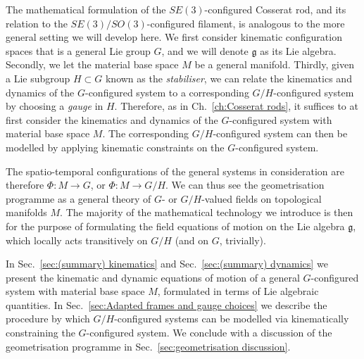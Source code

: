 The mathematical formulation of the $SE(3)$-configured Cosserat rod, and its relation to the $SE(3)/SO(3)$-configured filament, is analogous to the more general setting we will develop here. We first consider kinematic configuration spaces that is a general Lie group $G$, and we will denote $\mathfrak{g}$ as its Lie algebra. Secondly, we let the material base space $M$ be a general manifold. Thirdly, given a Lie subgroup $H \subset G$ known as the \textit{stabiliser}, we can relate the kinematics and dynamics of the $G$-configured system to a corresponding $G/H$-configured system by choosing a \textit{gauge} in $H$. Therefore, as in Ch.~\ref{ch:Cosserat rods}, it suffices to at first consider the kinematics and dynamics of the $G$-configured system with material base space $M$. The corresponding $G/H$-configured system can then be modelled by applying kinematic constraints on the $G$-configured system.

The spatio-temporal configurations of the general systems in consideration are therefore $\Phi : M \to G$, or $\Phi : M \to G/H$. We can thus see the geometrisation programme as a general theory of $G$- or $G/H$-valued fields on topological manifolds $M$. The majority of the mathematical technology we introduce is then for the purpose of formulating the field equations of motion on the Lie algebra $\mathfrak{g}$, which locally acts transitively on $G/H$ (and on $G$, trivially).

In Sec.~\ref{sec:(summary) kinematics} and Sec.~\ref{sec:(summary) dynamics} we present the kinematic and dynamic equations of motion of a general $G$-configured system with material base space $M$, formulated in terms of Lie algebraic quantities. In Sec.~\ref{sec:Adapted frames and gauge choices} we describe the procedure by which $G/H$-configured systems can be modelled via kinematically constraining the $G$-configured system. We conclude with a discussion of the geometrisation programme in Sec.~\ref{sec:geometrisation discussion}.


